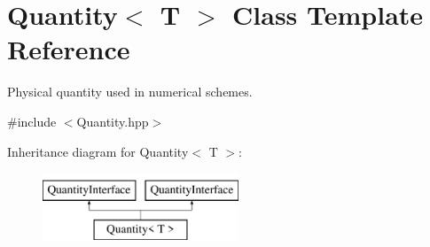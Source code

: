 \hypertarget{classQuantity}{}\section{Quantity$<$ T $>$ Class Template Reference}
\label{classQuantity}


Physical quantity used in numerical schemes.  




{\ttfamily \#include $<$Quantity.\+hpp$>$}

Inheritance diagram for Quantity$<$ T $>$\+:\begin{figure}[H]
\begin{center}
\leavevmode
\includegraphics[height=2.000000cm]{classQuantity}
\end{center}
\end{figure}
